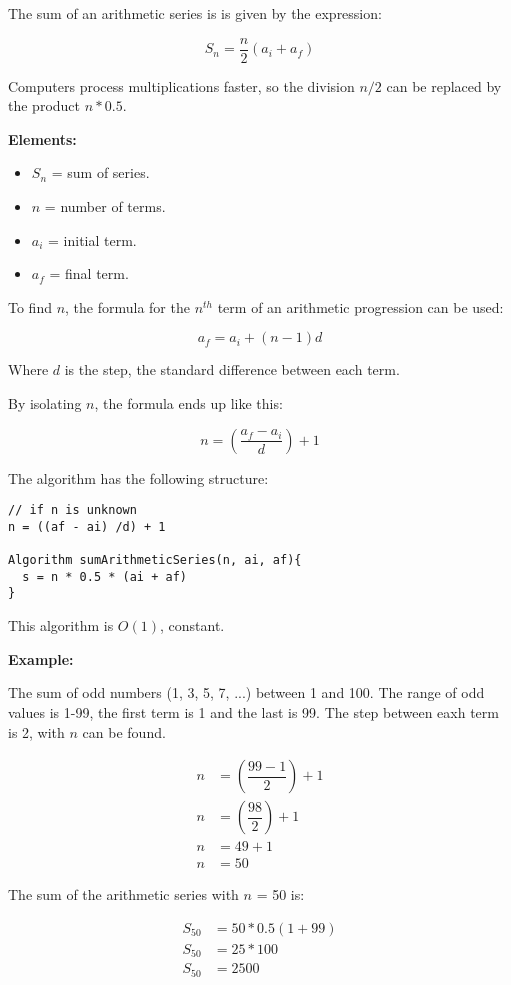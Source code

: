 The sum of an arithmetic series is is given by the expression:

\[\boxed{
  S_n = \dfrac{n}{2}\left(a_i+a_f\right)
}\]

Computers process multiplications faster, so the division $n/2$ can be replaced by the product $n*0.5$.

\textbf{Elements:}

\begin{itemize}
  \item $S_n$ = sum of series.
  \item $n$ = number of terms.
  \item $a_i$ = initial term.
  \item $a_f$ = final term.
\end{itemize}

To find $n$, the formula for the $n^{th}$ term of an arithmetic progression can be used:

\[\boxed{
  a_f = a_i + (n-1)d
}\]

Where $d$ is the step, the standard difference between each term.

By isolating $n$, the formula ends up like this:

\[\boxed{
  n = \left(\dfrac{a_f-a_i}{d}\right)+1
}\]

The algorithm has the following structure:

\begin{lstlisting}[style=general]
// if n is unknown
n = ((af - ai) /d) + 1

Algorithm sumArithmeticSeries(n, ai, af){
  s = n * 0.5 * (ai + af)
}
\end{lstlisting}

This algorithm is $O(1)$, constant.

\textbf{Example:}

The sum of odd numbers (1, 3, 5, 7, ...) between 1 and 100. The range of odd values is 1-99, the first term is 1 and the last is 99. The step between eaxh term is 2, with $n$ can be found.

\begin{align*}
  n &= \left(\dfrac{99-1}{2}\right)+1 \\
  n &= \left(\dfrac{98}{2}\right)+1 \\
  n &= 49+1 \\
  n &= 50
\end{align*}

The sum of the arithmetic series with $n$ = 50 is:

\begin{align*}
  S_{50} &= 50*0.5\left(1+99\right) \\
  S_{50} &= 25*100 \\
  S_{50} &= 2500
\end{align*}
